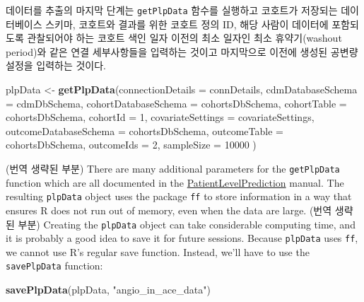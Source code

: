 \documentclass[10.5pt]{book}
\newenvironment{Shaded}{\begin{snugshade}}{\end{snugshade}}
\newcommand{\KeywordTok}[1]{\textcolor[rgb]{0.13,0.29,0.53}{\textbf{#1}}}
\newcommand{\DataTypeTok}[1]{\textcolor[rgb]{0.13,0.29,0.53}{#1}}
\newcommand{\DecValTok}[1]{\textcolor[rgb]{0.00,0.00,0.81}{#1}}
\newcommand{\StringTok}[1]{\textcolor[rgb]{0.31,0.60,0.02}{#1}}
\newcommand{\NormalTok}[1]{#1}
\theoremstyle{definition}
\theoremstyle{definition}
\theoremstyle{definition}
\theoremstyle{remark}
\begin{document}
데이터를 추출의 마지막 단계는 \texttt{getPlpData} 함수를 실행하고
코호트가 저장되는 데이터베이스 스키마, 코호트와 결과를 위한 코호트 정의
ID, 해당 사람이 데이터에 포함되도록 관찰되어야 하는 코호트 색인 일자
이전의 최소 일자인 최소 휴약기(washout period)와 같은 연결 세부사항들을
입력하는 것이고 마지막으로 이전에 생성된 공변량 설정을 입력하는 것이다.

\begin{Shaded}
\begin{Highlighting}[]
\NormalTok{plpData <-}\StringTok{ }\KeywordTok{getPlpData}\NormalTok{(}\DataTypeTok{connectionDetails =}\NormalTok{ connDetails,}
                      \DataTypeTok{cdmDatabaseSchema =}\NormalTok{ cdmDbSchema,}
                      \DataTypeTok{cohortDatabaseSchema =}\NormalTok{ cohortsDbSchema,}
                      \DataTypeTok{cohortTable =}\NormalTok{ cohortsDbSchema,}
                      \DataTypeTok{cohortId =} \DecValTok{1}\NormalTok{,}
                      \DataTypeTok{covariateSettings =}\NormalTok{ covariateSettings,}
                      \DataTypeTok{outcomeDatabaseSchema =}\NormalTok{ cohortsDbSchema,}
                      \DataTypeTok{outcomeTable =}\NormalTok{ cohortsDbSchema,}
                      \DataTypeTok{outcomeIds =} \DecValTok{2}\NormalTok{,}
                      \DataTypeTok{sampleSize =} \DecValTok{10000}
\NormalTok{)}
\end{Highlighting}
\end{Shaded}

(번역 생략된 부분) There are many additional parameters for the
\texttt{getPlpData} function which are all documented in the
\href{https://ohdsi.github.io/PatientLevelPrediction/}{PatientLevelPrediction}
manual. The resulting \texttt{plpData} object uses the package
\texttt{ff} to store information in a way that ensures R does not run
out of memory, even when the data are large. (번역 생략된 부분) Creating
the \texttt{plpData} object can take considerable computing time, and it
is probably a good idea to save it for future sessions. Because
\texttt{plpData} uses \texttt{ff}, we cannot use R's regular save
function. Instead, we'll have to use the \texttt{savePlpData} function:

\begin{Shaded}
\begin{Highlighting}[]
\KeywordTok{savePlpData}\NormalTok{(plpData, }\StringTok{"angio_in_ace_data"}\NormalTok{)}
\end{Highlighting}
\end{Shaded}
\end{document}
